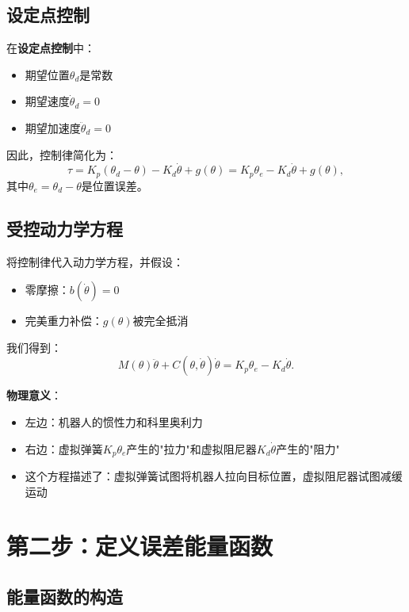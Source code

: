 \documentclass{article}
\begin{document}
\subsection{设定点控制}

在\textbf{设定点控制}中：
\begin{itemize}
\item 期望位置$\theta_d$是常数
\item 期望速度$\dot{\theta}_d = 0$
\item 期望加速度$\ddot{\theta}_d = 0$
\end{itemize}

因此，控制律简化为：
\begin{equation}
\tau = K_p(\theta_d - \theta) - K_d\dot{\theta} + g(\theta) = K_p\theta_e - K_d\dot{\theta} + g(\theta),
\end{equation}
其中$\theta_e = \theta_d - \theta$是位置误差。

\subsection{受控动力学方程}

将控制律代入动力学方程，并假设：
\begin{itemize}
\item 零摩擦：$b(\dot{\theta}) = 0$
\item 完美重力补偿：$g(\theta)$被完全抵消
\end{itemize}

我们得到：
\begin{equation}
M(\theta)\ddot{\theta} + C(\theta, \dot{\theta})\dot{\theta} = K_p\theta_e - K_d\dot{\theta}. \tag{52}
\end{equation}

\textbf{物理意义}：
\begin{itemize}
\item 左边：机器人的惯性力和科里奥利力
\item 右边：虚拟弹簧$K_p\theta_e$产生的"拉力"和虚拟阻尼器$K_d\dot{\theta}$产生的"阻力"
\item 这个方程描述了：虚拟弹簧试图将机器人拉向目标位置，虚拟阻尼器试图减缓运动
\end{itemize}

\section{第二步：定义误差能量函数}

\subsection{能量函数的构造}
\end{document}
